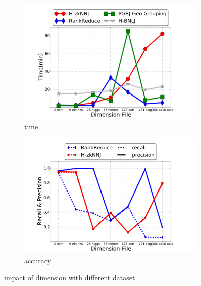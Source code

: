  \begin{figure}[!h]
 \centering
 \centering
		\begin{subfigure}[b]{0.25\textwidth}
                 \includegraphics[width=\textwidth]{img-perf/dim/datasettime.pdf} 
                \caption{time}
                \label{dim_time}
        \end{subfigure}%
        \begin{subfigure}[b]{0.25\textwidth}
                 \includegraphics[width=\textwidth]{img-perf/dim/datasetacc.pdf} 
                \caption{accuracy}
                \label{dim_acc}
        \end{subfigure}
         \caption{impact of dimension with different dataset}
          \label{fig:dim}
\end{figure}

